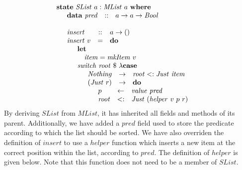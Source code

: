 \documentclass[authoryear,preprint]{sigplanconf}
\begin{document}
\begin{displaymath}
\begin{array}{l}
\mathbf{state}~\mathit{SList}~a : \mathit{MList}~a~\mathbf{where} \\
\quad \begin{array}{lcl}
\mathbf{data}~\mathit{pred}  & :: & a \to a \to \mathit{Bool}
\end{array}\\\\
\quad \begin{array}{lcl}
\mathit{insert} & :: & a \to ()\\
\mathit{insert}~v & = & \mathbf{do} \\
\multicolumn{3}{l}{\quad \begin{array}{lcl}
    \multicolumn{3}{l}{\mathbf{let}}\\
    \multicolumn{3}{l}{\quad \mathit{item} = \mathit{mkItem}~v} \\
    \multicolumn{3}{l}{\mathit{switch}~\mathit{root}~\$~\lambda \mathbf{case}} \\
    \multicolumn{3}{l}{\quad \begin{array}{lcl}
        \mathit{Nothing} & \to & \mathit{root} <: \mathit{Just}~\mathit{item}  \\
        (\mathit{Just}~r) & \to & \mathbf{do} \\
        \multicolumn{3}{l}{\quad \begin{array}{lcl}
            p & \leftarrow & \mathit{value}~\mathit{pred} \\
            \mathit{root} & <: & \mathit{Just}~(\mathit{helper}~v~p~r) 
            \end{array}}
        \end{array}}
    \end{array}}
\end{array}
\end{array}
\end{displaymath}
By deriving $\mathit{SList}$ from $\mathit{MList}$, it has inherited all fields and methods of its parent. Additionally, we have added a $\mathit{pred}$ field used to store the predicate according to which the list should be sorted. We have also overriden the definition of $\mathit{insert}$ to use a $\mathit{helper}$ function which inserts a new item at the correct position within the list, according to $\mathit{pred}$. The definition of $\mathit{helper}$ is given below. Note that this function does not need to be a member of $\mathit{SList}$.
\end{document}
